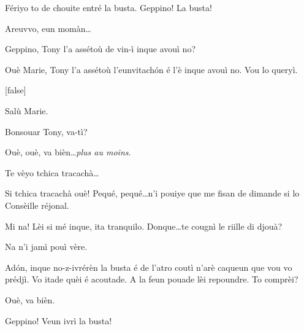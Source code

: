 \begin{drama}


\Mariespeaks Fériyo to de chouite entré la busta.  Geppino! La busta!

\Geppinospeaks Areuvvo, eun momàn\ldots


\Mariespeaks Geppino, Tony l’a assétoù de vin-ì inque avouì no?

\Geppinospeaks Ouè Marie, Tony l’a assétoù l'eunvitach\'on é l’è inque avouì no. Vou lo queryì.

[false]%


\Turispeaks Salù Marie.

\Mariespeaks Bonsouar Tony, va-tì?

\Turispeaks{} Ouè, ouè, va bièn\ldots \textit{plus au moins}. 

\Mariespeaks Te vèyo tchica tracachà\ldots

\Turispeaks Si tchica tracachà ouè! Pequé, pequé\ldots n’i pouiye que me fisan de dimande si lo Consèille réjonal.

\Mariespeaks Mi na! Lèi si mé inque, ita tranquilo. Donque\ldots te cougnì le riille di djouà?

\Turispeaks Na n'i jamì pouì vère.

\Mariespeaks Ad\'on, inque  no-z-ivrérèn  la busta é de l'atro coutì n'arè caqueun que vou vo prédjì. Vo itade quèi é acoutade. A la feun pouade lèi repoundre. To comprèi?

\Turispeaks Ouè, va bièn.

\Mariespeaks{} Geppino! Veun ivrì la busta!




\end{drama}
